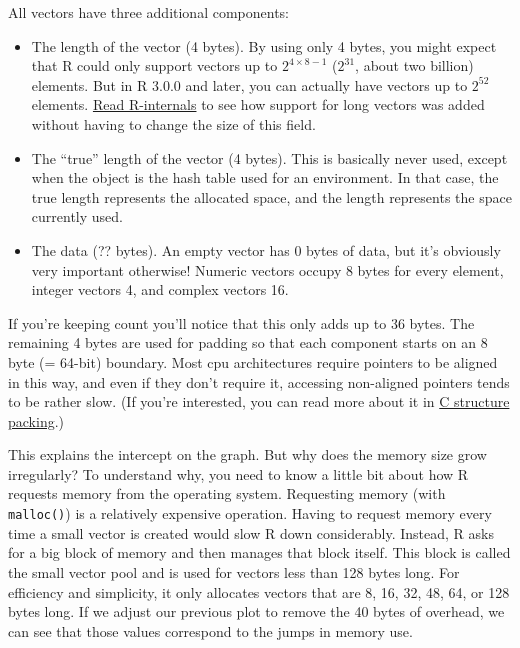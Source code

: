 All vectors have three additional components: 

\begin{itemize}
\item
  The length of the vector (4 bytes). By using only 4 bytes, you might
  expect that R could only support vectors up to
  \(2 ^ {4 \times 8 - 1}\) (\(2 ^ {31}\), about two billion) elements.
  But in R 3.0.0 and later, you can actually have vectors up to
  \(2 ^ {52}\) elements.
  \href{http://cran.r-project.org/doc/manuals/R-ints.html\#Long-vectors}{Read
  R-internals} to see how support for long vectors was added without
  having to change the size of this field. 
\item
  The ``true'' length of the vector (4 bytes). This is basically never
  used, except when the object is the hash table used for an
  environment. In that case, the true length represents the allocated
  space, and the length represents the space currently used.
\item
  The data (?? bytes). An empty vector has 0 bytes of data, but it's
  obviously very important otherwise! Numeric vectors occupy 8 bytes for
  every element, integer vectors 4, and complex vectors 16.
\end{itemize}

If you're keeping count you'll notice that this only adds up to 36
bytes. The remaining 4 bytes are used for padding so that each component
starts on an 8 byte (= 64-bit) boundary. Most cpu architectures require
pointers to be aligned in this way, and even if they don't require it,
accessing non-aligned pointers tends to be rather slow. (If you're
interested, you can read more about it in
\href{http://www.catb.org/esr/structure-packing/}{C structure packing}.)

This explains the intercept on the graph. But why does the memory size
grow irregularly? To understand why, you need to know a little bit about
how R requests memory from the operating system. Requesting memory (with
\texttt{malloc()}) is a relatively expensive operation. Having to
request memory every time a small vector is created would slow R down
considerably. Instead, R asks for a big block of memory and then manages
that block itself. This block is called the small vector pool and is
used for vectors less than 128 bytes long. For efficiency and
simplicity, it only allocates vectors that are 8, 16, 32, 48, 64, or 128
bytes long. If we adjust our previous plot to remove the 40 bytes of
overhead, we can see that those values correspond to the jumps in memory
use.

